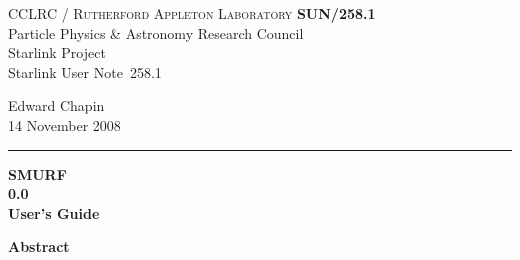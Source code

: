\documentclass[twoside,11pt]{article}
\newcommand{\stardoccategory}  {Starlink User Note}
\newcommand{\stardocinitials}  {SUN}
\newcommand{\stardocnumber}    {258.1}
\newcommand{\stardocauthors}   {Edward Chapin}
\newcommand{\stardocdate}      {14 November 2008}
\newcommand{\stardoctitle}     {SMURF}
\newcommand{\stardocversion}   {0.0}
\newcommand{\stardocmanual}    {User's Guide}
\newcommand{\stardocname}{\stardocinitials /\stardocnumber}
\newenvironment{latexonly}{}{}
\renewcommand{\_}{\texttt{\symbol{95}}}
\begin{document}
\thispagestyle{empty}

\begin{latexonly}
   CCLRC / \textsc{Rutherford Appleton Laboratory} \hfill \textbf{\stardocname}\\
   {\large Particle Physics \& Astronomy Research Council}\\
   {\large Starlink Project\\}
   {\large \stardoccategory\ \stardocnumber}
   \begin{flushright}
   \stardocauthors\\
   \stardocdate
   \end{flushright}
   \vspace{-4mm}
   \rule{\textwidth}{0.5mm}
   \vspace{5mm}
   \begin{center}
   {\Huge\textbf{\stardoctitle \\ [2.5ex]}}
   {\LARGE\textbf{\stardocversion \\ [4ex]}}
   {\Huge\textbf{\stardocmanual}}
   \end{center}
   \vspace{5mm}


   \vspace{10mm}
   \begin{center}
      {\Large\textbf{Abstract}}
   \end{center}
\end{latexonly}
\end{document}
